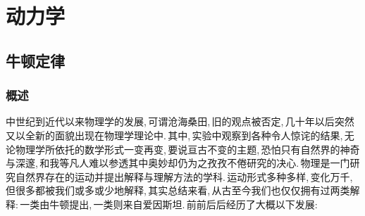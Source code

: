 \chapter{动力学}


\section{牛顿定律}

\subsection{概述}
中世纪到近代以来物理学的发展,\,可谓沧海桑田,\,旧的观点被否定,\,几十年以后突然又以全新的面貌出现在物理学理论中.\,其中,\,实验中观察到各种令人惊诧的结果,\,无论物理学所依托的数学形式一变再变,\,要说亘古不变的主题,\,恐怕只有自然界的神奇与深邃,\,和我等凡人难以参透其中奥妙却仍为之孜孜不倦研究的决心.\,物理是一门研究自然界存在的运动并提出解释与理解方法的学科.\,运动形式多种多样,\,变化万千,\,但很多都被我们或多或少地解释,\,其实总结来看,\,从古至今我们也仅仅拥有过两类解释:\,一类由牛顿提出,\,一类则来自爱因斯坦.\,前前后后经历了大概以下发展:

